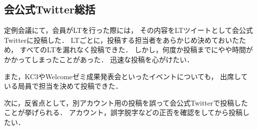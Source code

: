 \subsection*{会公式Twitter総括}



定例会議にて，会員がLTを行った際には，
その内容をLTツイートとして会公式Twitterに投稿した．
LTごとに，投稿する担当者をあらかじめ決めておいたため，
すべてのLTを漏れなく投稿できた．
しかし，何度か投稿までにやや時間がかかってしまったことがあった．
迅速な投稿を心がけたい．

また，KC3やWelcomeゼミ成果発表会といったイベントについても，
出席している局員で担当を決めて投稿できた．

次に，反省点として，別アカウント用の投稿を誤って会公式Twitterで投稿したことが挙げられる．
アカウント，誤字脱字などの正否を確認をしてから投稿したい．
